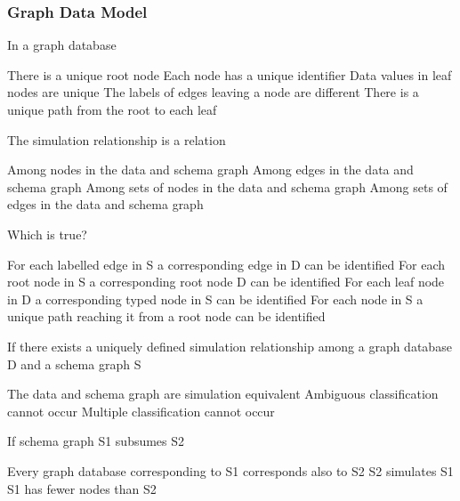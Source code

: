 \documentclass[12pt,a4paper]{exam} %
\begin{document}
\subsubsection{Graph Data Model}
\begin{questions}
\question In a graph database
\begin{checkboxes}
\choice There is a unique root node
\CorrectChoice Each node has a unique identifier
\choice Data values in leaf nodes are unique
\choice The labels of edges leaving a node are different
\choice There is a unique path from the root to each leaf
\end{checkboxes}

\question The simulation relationship is a relation
\begin{checkboxes}
\CorrectChoice Among nodes in the data and schema graph
\choice Among edges in the data and schema graph
\choice Among sets of nodes in the data and schema graph
\choice Among sets of edges in the data and schema graph
\end{checkboxes}

\question Which is true?
\begin{checkboxes}
\choice For each labelled edge in S a corresponding edge in D
can be identified
\choice For each root node in S a corresponding root node D
can be identified
\CorrectChoice For each leaf node in D a corresponding typed node in
S can be identified
\choice For each node in S a unique path reaching it from a
root node can be identified
\end{checkboxes}

\question If there exists a uniquely defined simulation relationship among a graph database D and a schema graph S
\begin{checkboxes}
\choice The data and schema graph are simulation equivalent
\CorrectChoice Ambiguous classification cannot occur
\choice Multiple classification cannot occur
\end{checkboxes}

\question If schema graph S1 subsumes S2
\begin{checkboxes}
\choice Every graph database corresponding to S1 corresponds also to S2
\CorrectChoice S2 simulates S1
\choice S1 has fewer nodes than S2
\end{checkboxes}
\end{questions}
\end{document}
